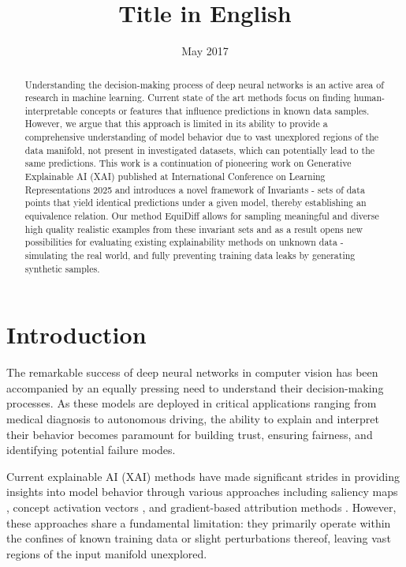 \documentclass[licencjacka,en]{pracamgr}
\title{Title in English}
\date{May 2017}
\newcommand{\method}[1]{EquiDiff}  %
\newcommand{\invariantimages}[1]{Invariants}  %
\begin{document}
\maketitle

\begin{abstract}
Understanding the decision-making process of deep neural networks is an active area of research in machine learning. Current state of the art methods focus on finding human-interpretable concepts or features that influence predictions in known data samples. However, we argue that this approach is limited in its ability to provide a comprehensive understanding of model behavior due to vast unexplored regions of the data manifold, not present in investigated datasets, which can potentially lead to the same predictions. This work is a continuation of pioneering work on Generative Explainable AI (XAI) \cite{sobieski2024rethinkingvisualcounterfactualexplanations} published at International Conference on Learning Representations 2025 and introduces a novel framework of \invariantimages{} - sets of data points that yield identical predictions under a given model, thereby establishing an equivalence relation. Our method \method{} allows for sampling meaningful and diverse high quality realistic examples from these invariant sets and as a result opens new possibilities for  evaluating existing explainability methods on unknown data - simulating the real world, and fully preventing training data leaks by generating synthetic samples. 
\end{abstract}

\tableofcontents

\chapter{Introduction}\label{r:introduction}

The remarkable success of deep neural networks in computer vision has been accompanied by an equally pressing need to understand their decision-making processes. As these models are deployed in critical applications ranging from medical diagnosis to autonomous driving, the ability to explain and interpret their behavior becomes paramount for building trust, ensuring fairness, and identifying potential failure modes.

Current explainable AI (XAI) methods have made significant strides in providing insights into model behavior through various approaches including saliency maps \cite{simonyan2014deepinsideconvolutionalnetworks}, concept activation vectors \cite{kim2018interpretabilityfeatureattributionquantitative}, and gradient-based attribution methods \cite{sundararajan2017axiomaticattributiondeepnetworks}. However, these approaches share a fundamental limitation: they primarily operate within the confines of known training data or slight perturbations thereof, leaving vast regions of the input manifold unexplored.
\end{document}
